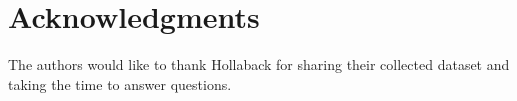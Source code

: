 \documentclass{acm_proc_article-sp}
\begin{document}
\section{Acknowledgments}
The authors would like to thank Hollaback for sharing their collected dataset and taking the time to answer questions.

{\footnotesize
}  %
%
%
\end{document}
